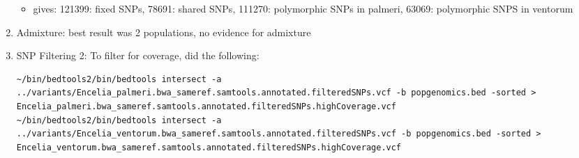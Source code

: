 \documentclass[idxtotoc,hyperref,openany,oneside]{labbook} %
\begin{document}
\begin{enumerate}
\begin{itemize}
\item gives: 121399: fixed SNPs, 78691: shared SNPs, 111270: polymorphic SNPs in palmeri, 63069: polymorphic SNPS in ventorum
\end{itemize}
\item Admixture: best result was 2 populations, no evidence for admixture
\item SNP Filtering 2: To filter for coverage, did the following:
\begin{verbatim}
~/bin/bedtools2/bin/bedtools intersect -a ../variants/Encelia_palmeri.bwa_sameref.samtools.annotated.filteredSNPs.vcf -b popgenomics.bed -sorted > Encelia_palmeri.bwa_sameref.samtools.annotated.filteredSNPs.highCoverage.vcf
~/bin/bedtools2/bin/bedtools intersect -a ../variants/Encelia_ventorum.bwa_sameref.samtools.annotated.filteredSNPs.vcf -b popgenomics.bed -sorted > Encelia_ventorum.bwa_sameref.samtools.annotated.filteredSNPs.highCoverage.vcf
\end{verbatim}
\end{enumerate}
\end{document}
